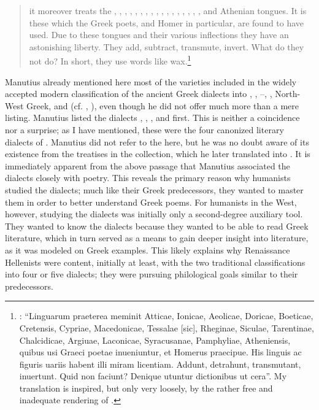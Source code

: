 \begin{quote}
it moreover treats the , , , , , , , , , , , , , , , , , and Athenian tongues. It is these which the Greek poets, and Homer in particular, are found to have used. Due to these tongues and their various inflections they have an astonishing liberty. They add, subtract, transmute, invert. What do they not do? In short, they use words like wax.\footnote{\citet[*.ii\textsc{\textsuperscript{v}}]{Manutius1496Aldus}: “Linguarum praeterea meminit Atticae, Ionicae, Aeolicae, Doricae, Boeticae, Cretensis, Cypriae, Macedonicae, Tessalae [sic], Rheginae, Siculae, Tarentinae, Chalcidicae, Argiuae, Laconicae, Syracusanae, Pamphyliae, Atheniensis, quibus usi Graeci poetae inueniuntur, et Homerus praecipue. His linguis ac figuris uariis habent illi miram licentiam. Addunt, detrahunt, transmutant, inuertunt. Quid non faciunt? Denique utuntur dictionibus ut cera”. My translation is inspired, but only very loosely, by the rather free and inadequate rendering of \citet[12]{Bean1958}.} 
\end{quote}

Manutius already mentioned here most of the varieties included in the widely accepted modern classification of the ancient Greek dialects into , , –, , North-West Greek, and  (cf. , ), even though he did not offer much more than a mere listing. Manutius listed the dialects , , , and  first. This is neither a coincidence nor a surprise; as I have mentioned, these were the four canonized literary dialects of . Manutius did not refer to the  here, but he was no doubt aware of its existence from the treatises in the collection, which he later translated into . It is immediately apparent from the above passage that Manutius associated the dialects closely with poetry. This reveals the primary reason why humanists studied the dialects; much like their Greek predecessors, they wanted to master them in order to better understand Greek poems. For humanists in the  West, however, studying the dialects was initially only a second-degree auxiliary tool. They wanted to know the dialects because they wanted to be able to read Greek literature, which in turn served as a means to gain deeper insight into  literature, as it was modeled on Greek examples. This likely explains why Renaissance Hellenists were content, initially at least, with the two traditional classifications into four or five dialects; they were pursuing philological goals similar to their predecessors.

